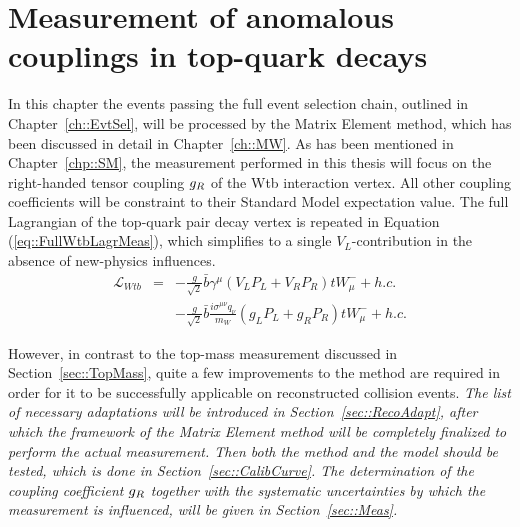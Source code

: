 \chapter{Measurement of anomalous couplings in top-quark decays} \label{ch::Analysis}

In this chapter the events passing the full event selection chain, outlined in Chapter~\ref{ch::EvtSel}, will be processed by the Matrix Element method, which has been discussed in detail in Chapter~\ref{ch::MW}. As has been mentioned in Chapter~\ref{chp::SM}, the measurement performed in this thesis will focus on the right-handed tensor coupling $g_{R}$ of the Wtb interaction vertex. All other coupling coefficients will be constraint to their Standard Model expectation value. The full Lagrangian of the top-quark pair decay vertex is repeated in Equation (\ref{eq::FullWtbLagrMeas}), which simplifies to a single $V_L$-contribution in the absence of new-physics influences.
\begin{eqnarray} \label{eq::FullWtbLagrMeas}
  \mathcal{L}_{Wtb} & = & - \frac{g}{\sqrt{2}} \bar{b} \gamma^{\mu} \left( V_L P_L + V_R P_R \right) t W_{\mu}^{-} + h.c. \nonumber \\
		    &   & - \frac{g}{\sqrt{2}} \bar{b} \frac{i\sigma^{\mu \nu} q_{\nu}}{m_{W}} \left( g_L P_L + g_R P_R \right) t W_{\mu}^{-} + h.c.
\end{eqnarray}

However, in contrast to the top-mass measurement discussed in Section~\ref{sec::TopMass}, quite a few improvements to the method are required in order for it to be successfully applicable on reconstructed collision events.
\textit{The list of necessary adaptations will be introduced in Section~\ref{sec::RecoAdapt}, after which the framework of the Matrix Element method will be completely finalized to perform the actual measurement.
Then both the method and the model should be tested, which is done in Section~\ref{sec::CalibCurve}.
The determination of the coupling coefficient $g_{R}$ together with the systematic uncertainties by which the measurement is influenced, will be given in Section~\ref{sec::Meas}.}

